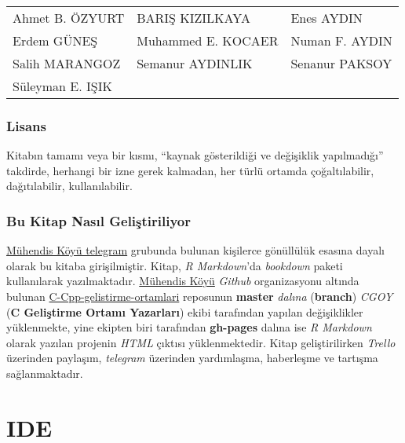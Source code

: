 \documentclass[
]{book}
\begin{document}
\begin{tabular}{l|l|l}
\hline
 &  & \\
\hline
Ahmet B. ÖZYURT & BARIŞ KIZILKAYA & Enes AYDIN\\
\hline
Erdem GÜNEŞ & Muhammed E. KOCAER & Numan F. AYDIN\\
\hline
Salih MARANGOZ & Semanur AYDINLIK & Senanur PAKSOY\\
\hline
Süleyman E. IŞIK &  & \\
\hline
\end{tabular}

\hypertarget{lisans}{%
\section*{Lisans}\label{lisans}}

Kitabın tamamı veya bir kısmı, ``kaynak gösterildiği ve değişiklik yapılmadığı'' takdirde, herhangi bir izne gerek kalmadan, her türlü ortamda çoğaltılabilir, dağıtılabilir, kullanılabilir.

\hypertarget{bu-kitap-nasux131l-geliux15ftiriliyor}{%
\section*{Bu Kitap Nasıl Geliştiriliyor}\label{bu-kitap-nasux131l-geliux15ftiriliyor}}

\href{https://t.me/koyumuhendis}{Mühendis Köyü telegram} grubunda bulunan kişilerce gönüllülük esasına dayalı olarak bu kitaba girişilmiştir. Kitap, \emph{R Markdown}'da \emph{bookdown} paketi kullanılarak yazılmaktadır. \href{https://github.com/MuhendisKoyu}{Mühendis Köyü} \emph{Github} organizasyonu altında bulunan \href{https://github.com/MuhendisKoyu/C-Cpp-gelistirme-ortamlari}{C-Cpp-gelistirme-ortamlari} reposunun \textbf{master} \emph{dalına} (\textbf{branch}) \emph{CGOY} (\textbf{C Geliştirme Ortamı Yazarları}) ekibi tarafından yapılan değişiklikler yüklenmekte, yine ekipten biri tarafından \textbf{gh-pages} dalına ise \emph{R Markdown} olarak yazılan projenin \emph{HTML} çıktısı yüklenmektedir. Kitap geliştirilirken \emph{Trello} üzerinden paylaşım, \emph{telegram} üzerinden yardımlaşma, haberleşme ve tartışma sağlanmaktadır.

\hypertarget{part-ide}{%
\part{IDE}\label{part-ide}}
\end{document}
